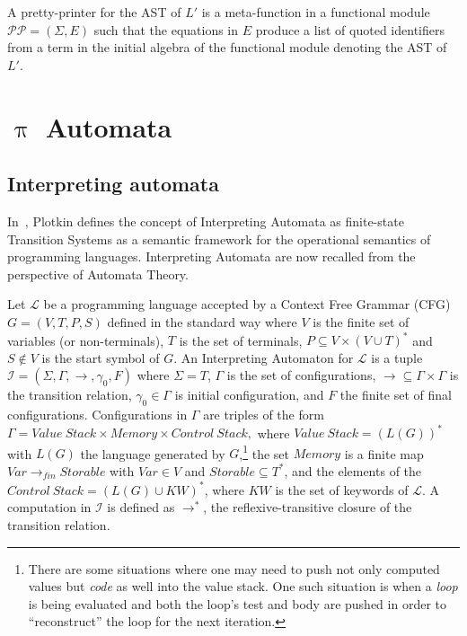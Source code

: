 \documentclass[a4paper,openany]{book}
\begin{document}
A pretty-printer for the AST of $L'$ is a meta-function in a functional module $\mathcal{PP} = (\Sigma, E)$ such that the equations in $E$ produce a list of quoted identifiers from a term in the initial algebra of the functional module denoting the AST of $L'$.


\chapter{$\uppi$ Automata}\label{sec:gia}

\section{Interpreting automata}

In~\cite{plotkin}, Plotkin defines the concept of Interpreting Automata as finite-state Transition Systems as a semantic framework for the operational semantics of programming languages. Interpreting Automata are now recalled from the perspective of Automata Theory.

Let $\mathcal{L}$ be a programming language accepted by a Context Free Grammar (CFG) $G = (V, T, P, S)$ defined in the standard way where $V$ is the finite set of variables (or non-terminals), $T$ is the set of terminals, $P \subseteq V \times (V \cup T)^*$ and $S \not\in V$ is the start symbol of $G$.
An Interpreting Automaton for $\mathcal{L}$ is a tuple $\mathcal{I} = (\Sigma, \Gamma, \rightarrow, \gamma_0, F)$ where $\Sigma = T$, $\Gamma$ is the set of configurations, $\rightarrow \subseteq \Gamma \times \Gamma$ is the transition relation, $\gamma_0 \in \Gamma$ is initial configuration, and $F$ the finite set of final configurations. Configurations in \(\Gamma\) are triples of the form
\(
\Gamma = \mathit{Value~Stack} \times \mathit{Memory} \times \mathit{Control~Stack},
\)
where $\mathit{Value~Stack} = (L(G))^*$ with $L(G)$ the language generated by $G$,\footnote{There are some situations where one may need to push not only computed values but \emph{code} as well into the value stack. One such situation is when a \emph{loop} is being evaluated and both the loop's test and body are pushed in order to ``reconstruct'' the loop for the next iteration.} the set
\(\mathit{Memory}\) is a finite map \(\mathit{Var}
\to_{\mathit{fin}} \mathit{Storable}\) with $\mathit{Var} \in V$ and $\mathit{Storable} \subseteq T^*$, and the elements of the
$\mathit{Control~Stack} = (L(G) \cup \mathit{KW})^*$, where $\mathit{KW}$ is the set of keywords of $\mathcal{L}$. 
A computation in $\mathcal{I}$ is defined as $\rightarrow^*$, the reflexive-transitive closure of the transition relation.
\end{document}

